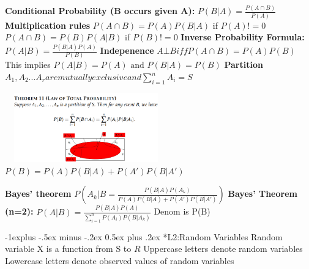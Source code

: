 \documentclass[10pt, landscape]{article}
\makeatletter
\renewcommand{\subsection}{\@startsection{subsection}{2}{0mm}%
                                {-1explus -.5ex minus -.2ex}%
                                {0.5ex plus .2ex}%
                                {\normalfont\normalsize\bfseries}}
\makeatother
\begin{document}
\begin{multicols}{4}
\textbf{Conditional Probability (B occurs given A):} $P(B|A)=\frac{P(A\cap B)}{P(A)}$ \newline
\textbf{Multiplication rules} \newline
 $P(A\cap B)=P(A)P(B|A)$ if $P(A)!=0$ \newline
$P(A\cap B)=P(B)P(A|B)$ if $P(B)!=0$ \newline
\textbf{Inverse Probability Formula:} $P(A|B)=\frac{P(B|A)P(A)}{P(B)}$ \newline
\textbf{Indepenence} $A\bot B iff P(A \cap B)=P(A)P(B)$ This implies $P(A|B)=P(A) \text{ and } P(B|A)=P(B)$ \newline
\textbf{Partition} $A_1,A_2...A_r {are mutually exclusive and} \sum_{i=1}^{n}A_i=S$ \newline

\includegraphics[width=7cm, height=3cm]{lotp.png}
$P(B)=P(A)P(B|A)+P(A')P(B|A')$ \newline

\textbf{Bayes' theorem} $P(A_k|B=\frac{P(B|A)P(A_k)}{P(A)P(B|A)+P(A')P(B|A')})$ \newline
\textbf{Bayes' Theorem (n=2):} $P(A|B)=\frac{P(B|A)P(A)}{\sum_{i=1}^{n}P(A_i)P(B|A_k)}$ Denom is P(B) \newline

\subsection*{L2:Random Variables}
Random variable X is a function from S to $R$ \newline
Uppercase letters denote random variables \newline
Lowercase letters denote observed values of random variables \newline


\end{multicols}
\end{document}
